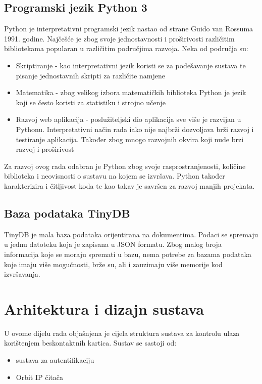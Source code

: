 \documentclass[times, utf8, zavrsni]{fer}
\begin{document}
\subsection{Programski jezik Python 3}
Python \citep{12} je interpretativni programski jezik nastao od strane Guido van Rossuma 1991. godine. Najčešće je zbog svoje jednostavnosti i proširivosti različitim bibliotekama popularan u različitim područjima razvoja. Neka od područja su:

\begin{itemize}
\item Skriptiranje - kao interpretativni jezik koristi se za podešavanje sustava te pisanje jednostavnih skripti za različite namjene
\item Matematika - zbog velikog izbora matematičkih biblioteka Python je jezik koji se često koristi za statistiku i strojno učenje
\item Razvoj web aplikacija - poslužiteljski dio aplikacija sve više je razvijan u Pythonu. Interpretativni način rada iako nije najbrži dozvoljava brži razvoj i testiranje aplikacija. Također zbog mnogo razvojnih okvira koji nude brzi razvoj i proširivost
\end{itemize} 

Za razvoj ovog rada odabran je Python zbog svoje rasprostranjenosti, količine biblioteka i neovisnosti o sustavu na kojem se izvršava. Python također karakterizira i čitljivost koda te kao takav je savršen za razvoj manjih projekata.


\subsection{Baza podataka TinyDB}
TinyDB \citep{13} je mala baza podataka orijentirana na dokumentima. Podaci se spremaju u jednu datoteku koja je zapisana u JSON formatu. Zbog malog broja informacija koje se moraju spremati u bazu, nema potrebe za bazama podataka koje imaju više mogućnosti, brže su, ali i zauzimaju više memorije kod izvršavanja.

\section{Arhitektura i dizajn sustava}
U ovome dijelu rada objašnjena je cijela struktura sustava za kontrolu ulaza korištenjem beskontaktnih kartica. Sustav se sastoji od:
\begin{itemize}
\item sustava za autentifikaciju
\item Orbit IP čitača
\end{itemize}
\end{document}
